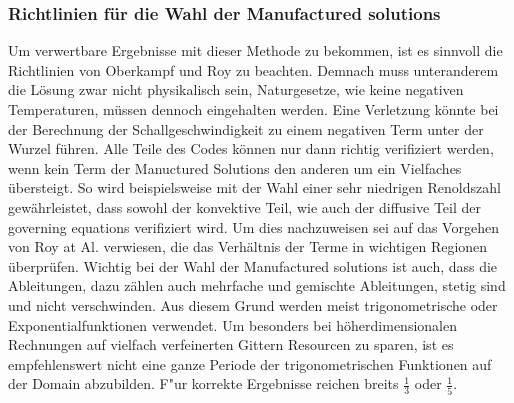 \subsubsection{Richtlinien für die Wahl der Manufactured solutions}
Um verwertbare Ergebnisse mit dieser Methode zu bekommen, ist es sinnvoll die Richtlinien von Oberkampf und Roy \cite{bookMMS} zu beachten. Demnach muss unteranderem die Lösung zwar nicht physikalisch sein, Naturgesetze, wie keine negativen Temperaturen, müssen dennoch eingehalten werden. Eine Verletzung könnte bei der Berechnung der Schallgeschwindigkeit zu einem negativen Term unter der Wurzel führen.
Alle Teile des Codes können nur dann richtig verifiziert werden, wenn kein Term der Manuctured Solutions den anderen um ein Vielfaches übersteigt. So wird beispielsweise mit der Wahl einer sehr niedrigen Renoldszahl gewährleistet, dass sowohl der konvektive Teil, wie auch der diffusive Teil der governing equations verifiziert wird. Um dies nachzuweisen sei auf das Vorgehen von Roy at Al. \cite{roy2007verification} verwiesen, die das Verhältnis der Terme in wichtigen Regionen überprüfen.
Wichtig bei der Wahl der Manufactured solutions ist auch, dass die Ableitungen, dazu zählen auch mehrfache und gemischte Ableitungen, stetig sind und nicht verschwinden. Aus diesem Grund werden meist trigonometrische oder Exponentialfunktionen verwendet.
Um besonders bei höherdimensionalen Rechnungen auf vielfach verfeinerten Gittern Resourcen zu sparen, ist es empfehlenswert nicht eine ganze Periode der trigonometrischen Funktionen auf der Domain abzubilden. F"ur korrekte Ergebnisse reichen breits $\frac{1}{3}$ oder $\frac{1}{5}$.
